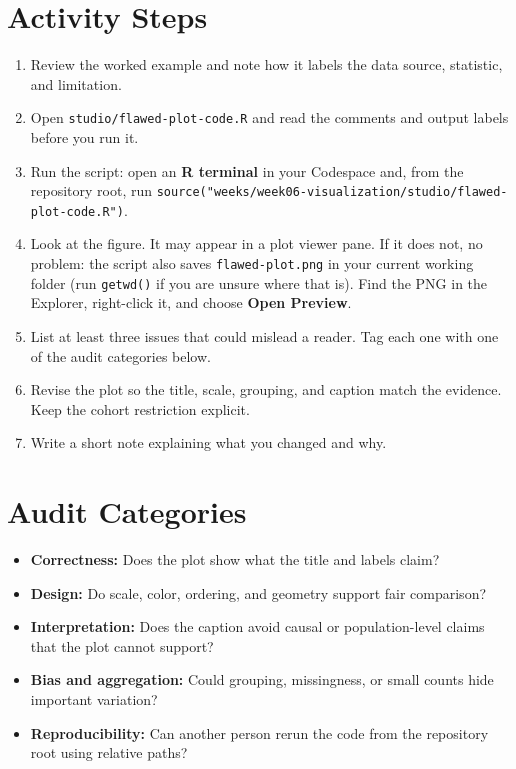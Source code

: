 \documentclass[
  letterpaper,
  DIV=11,
  numbers=noendperiod,
  oneside]{scrreprt}
\providecommand{\tightlist}{%
  \setlength{\itemsep}{0pt}\setlength{\parskip}{0pt}}
\begin{document}
\section*{Activity Steps}\label{activity-steps}


\begin{enumerate}
\def\labelenumi{\arabic{enumi}.}
\tightlist
\item
  Review the worked example and note how it labels the data source,
  statistic, and limitation.
\item
  Open \texttt{studio/flawed-plot-code.R} and read the comments and
  output labels before you run it.
\item
  Run the script: open an \textbf{R terminal} in your Codespace and,
  from the repository root, run
  \texttt{source("weeks/week06-visualization/studio/flawed-plot-code.R")}.
\item
  Look at the figure. It may appear in a plot viewer pane. If it does
  not, no problem: the script also saves \texttt{flawed-plot.png} in
  your current working folder (run \texttt{getwd()} if you are unsure
  where that is). Find the PNG in the Explorer, right-click it, and
  choose \textbf{Open Preview}.
\item
  List at least three issues that could mislead a reader. Tag each one
  with one of the audit categories below.
\item
  Revise the plot so the title, scale, grouping, and caption match the
  evidence. Keep the cohort restriction explicit.
\item
  Write a short note explaining what you changed and why.
\end{enumerate}

\section*{Audit Categories}\label{audit-categories}


\begin{itemize}
\tightlist
\item
  \textbf{Correctness:} Does the plot show what the title and labels
  claim?
\item
  \textbf{Design:} Do scale, color, ordering, and geometry support fair
  comparison?
\item
  \textbf{Interpretation:} Does the caption avoid causal or
  population-level claims that the plot cannot support?
\item
  \textbf{Bias and aggregation:} Could grouping, missingness, or small
  counts hide important variation?
\item
  \textbf{Reproducibility:} Can another person rerun the code from the
  repository root using relative paths?
\end{itemize}
\end{document}
